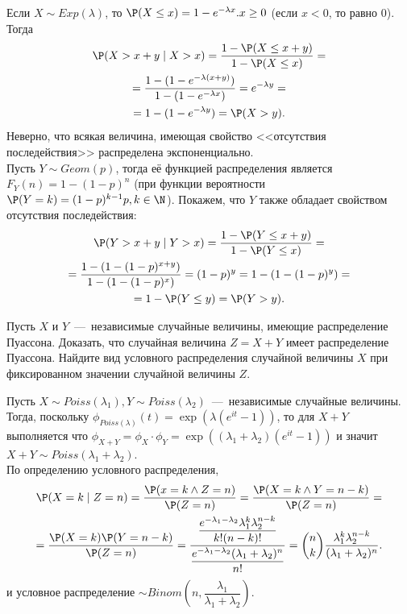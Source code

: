 \begin{solution}
    Если $X \sim Exp(\lambda)$, то $\P(X \leq x) = 1 - e^{-\lambda x}. x \geq 0$ (если $x < 0$, то равно 0).
    Тогда
    \begin{multline*}
        \P(X > x + y \mid X > x) = \dfrac{1 - \P(X \leq x + y)}{1 - \P(X \leq x)} = \\ =
        \dfrac{1 - (1 - e^{-\lambda (x + y)})}{1 - (1 - e^{-\lambda x})} = e^{-\lambda y} =  \\ =
        1 - (1 - e^{-\lambda y}) = \P(X > y).
    \end{multline*}
    Неверно, что всякая величина, имеющая свойство <<отсутствия последействия>> распределена экспоненциально. \\
    Пусть $Y \sim Geom(p)$, тогда её функцией распределения является $F_Y(n) = 1 - (1 - p)^n$ (при функции вероятности $\P(Y = k) = (1 - p)^{k - 1}p, k \in \N$).
    Покажем, что $Y$ также обладает свойством отсутствия последействия:
    \begin{multline*}
        \P(Y > x + y \mid Y > x) = \dfrac{1 - \P(Y \leq x + y)}{1 - \P(Y \leq x)} = \\ =
        \dfrac{1 - (1 - (1 - p)^{x + y})}{1 - (1 - (1 - p)^{x})} = (1 - p)^{y} = 1 - (1 - (1 - p)^y) =  \\ =
        1 - \P(Y \leq y) = \P(Y > y).
    \end{multline*}
\end{solution}
\begin{problem}[54]
    Пусть $X$ и $Y$~---~независимые случайные величины, имеющие распределение Пуассона.
    Доказать, что случайная величина $Z = X + Y$ имеет распределение Пуассона.
    Найдите вид условного распределения случайной величины $X$ при фиксированном значении случайной величины $Z$.
\end{problem}
\begin{solution}
    Пусть $X \sim Poiss(\lambda_1), Y \sim Poiss(\lambda_2)$~---~независимые случайные величины.
    Тогда, поскольку $\phi_{Poiss(\lambda)}(t) = \exp(\lambda(e^{it} - 1))$, то для $X + Y$ выполняется что $\phi_{X + Y} = \phi_X \cdot \phi_Y = \exp((\lambda_1 + \lambda_2)(e^{it} - 1))$ и значит $X + Y \sim Poiss(\lambda_1 + \lambda_2)$. \\
    По определению условного распределения,
    \begin{multline*}
        \P(X = k \mid Z = n) = \dfrac{\P(x = k \wedge Z = n)}{\P(Z = n)} = \dfrac{\P(X = k \wedge Y = n - k)}{\P(Z = n)} = \\
        = \dfrac{\P(X = k)\P(Y = n - k)}{\P(Z = n)} = \dfrac{\dfrac{e^{-\lambda_1 - \lambda_2}\lambda_1^k\lambda_2^{n - k}}{k!(n - k)!}}{\dfrac{e^{-\lambda_1 - \lambda_2}(\lambda_1 + \lambda_2)^n}{n!}} = \binom{n}{k}\dfrac{\lambda_1^k\lambda_2^{n - k}}{(\lambda_1 + \lambda_2)^n}.
    \end{multline*}
    и условное распределение $\sim Binom(n, \dfrac{\lambda_1}{\lambda_1 + \lambda_2})$.
\end{solution}
